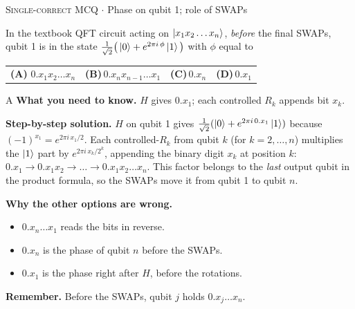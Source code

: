 \documentclass[11pt,a4paper]{article}
\newcommand{\optlabel}[1]{\textbf{(#1)}}
\newcommand{\correctlabel}[1]{\textcolor{okgreen}{\textbf{(#1)}\,\ding{51}}}
\newenvironment{qitem}[1]{\begin{list}{}{\setlength{\leftmargin}{3.3em}\setlength{\labelwidth}{3.1em}%
  \setlength{\labelsep}{0.2em}\setlength{\topsep}{3pt}\setlength{\parsep}{3pt}}\item[\textbf{Q.#1}\hfill]}{\end{list}}
\newcommand{\qsep}{\par\vspace{2pt}{\color{black!15}\hrule}\vspace{4pt}}
\newcommand{\qmeta}[2]{{\footnotesize\color{black!60}\textsc{#1} \;$\cdot$\; #2}\par}
\begin{document}
\begin{qitem}{47}
\qmeta{Single-correct MCQ}{Phase on qubit 1; role of SWAPs}
In the textbook QFT circuit acting on $\ket{x_1x_2\dots x_n}$, \emph{before} the final SWAPs, qubit 1 is in the state
$\frac{1}{\sqrt2}\big(\ket0 + e^{2\pi i\,\phi}\ket1\big)$ with $\phi$ equal to
\par\smallskip\noindent\begin{tabularx}{\linewidth}{@{}*{4}{L}@{}}
\correctlabel{A}\,$0.x_1x_2\dots x_n$ & \optlabel{B}\,$0.x_nx_{n-1}\dots x_1$ & \optlabel{C}\,$0.x_n$ & \optlabel{D}\,$0.x_1$
\end{tabularx}
\end{qitem}
\begin{solbox}{A}
\textbf{\color{brand}What you need to know.} $H$ gives $0.x_1$; each controlled $R_k$ appends bit $x_k$.

\textbf{\color{brand}Step-by-step solution.} $H$ on qubit 1 gives $\frac{1}{\sqrt2}(\ket0 + e^{2\pi i\,0.x_1}\ket1)$ because $(-1)^{x_1} = e^{2\pi i\,x_1/2}$.
Each controlled-$R_k$ from qubit $k$ (for $k = 2, \dots, n$) multiplies the $\ket1$ part by $e^{2\pi i\,x_k/2^k}$, appending the
binary digit $x_k$ at position $k$: $0.x_1 \to 0.x_1x_2 \to \dots \to 0.x_1x_2\dots x_n$.
This factor belongs to the \emph{last} output qubit in the product formula, so the SWAPs move it from qubit 1 to qubit $n$.

\textbf{\color{brand}Why the other options are wrong.}
\begin{itemize}[leftmargin=2.4em, itemsep=1pt, topsep=2pt]
\item[\textbf{(B)}] $0.x_n\dots x_1$ reads the bits in reverse.
\item[\textbf{(C)}] $0.x_n$ is the phase of qubit $n$ before the SWAPs.
\item[\textbf{(D)}] $0.x_1$ is the phase right after $H$, before the rotations.
\end{itemize}
\textbf{\color{brand}Remember.} Before the SWAPs, qubit $j$ holds $0.x_j\dots x_n$.
\end{solbox}
\qsep
\end{document}
